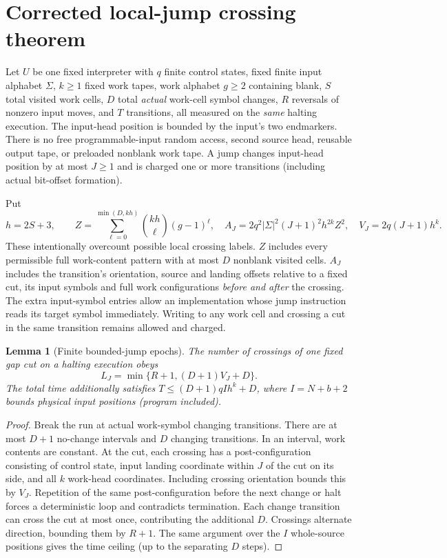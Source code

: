 \documentclass[11pt]{article}
\newtheorem{lemma}[theorem]{Lemma}
\begin{document}
\section{Corrected local-jump crossing theorem}
Let $U$ be one fixed interpreter with $q$ finite control states,
fixed finite input alphabet $\Sigma$, $k\ge1$ fixed work tapes,
work alphabet $g\ge2$ containing blank, $S$ total visited
work cells, $D$ total \emph{actual} work-cell symbol changes,
$R$ reversals of nonzero input moves, and $T$ transitions,
all measured on the \emph{same} halting execution.
The input-head position is bounded by the input's two endmarkers.
There is no free programmable-input random access, second source head,
reusable output tape, or preloaded nonblank work tape. A jump changes
input-head position by at most $J\ge1$ and is charged one or more
transitions (including actual bit-offset formation).

Put
\[
 h=2S+3,\qquad
 Z=\sum_{\ell=0}^{\min(D,kh)}\binom{kh}{\ell}(g-1)^\ell,
 \quad
 A_J=2q^2|\Sigma|^2(J+1)^2h^{2k}Z^2,
 \quad V_J=2q(J+1)h^k.
\]
These intentionally overcount possible local crossing labels.
$Z$ includes every permissible full work-content pattern with
at most $D$ nonblank visited cells.
$A_J$ includes the transition's orientation, source and landing
offsets relative to a fixed cut, its input symbols and full
work configurations \emph{before and after} the crossing.
The extra input-symbol entries allow an implementation whose
jump instruction reads its target symbol immediately.
Writing to any work cell and crossing a cut in the same
transition remains allowed and charged.

\begin{lemma}[Finite bounded-jump epochs]\label{lem:epoch}
The number of crossings of one fixed gap cut on a halting
execution obeys
\[
 L_J=\min\{R+1,(D+1)V_J+D\}.
\]
The total time additionally satisfies
$T\le (D+1)qIh^k+D$, where
$I=N+b+2$ bounds physical input positions (program included).
\end{lemma}
\begin{proof}
Break the run at actual work-symbol changing transitions.
There are at most $D+1$ no-change intervals and $D$
changing transitions. In an interval, work contents are
constant. At the cut, each crossing has a post-configuration
consisting of control state, input landing coordinate
within $J$ of the cut on its side, and all $k$ work-head
coordinates. Including crossing orientation bounds this by
$V_J$. Repetition of the same post-configuration before
the next change or halt forces a deterministic loop and
contradicts termination. Each change transition can cross
the cut at most once, contributing the additional $D$.
Crossings alternate direction, bounding them by $R+1$.
The same argument over the $I$ whole-source positions
gives the time ceiling (up to the separating $D$ steps).
\end{proof}
\end{document}
